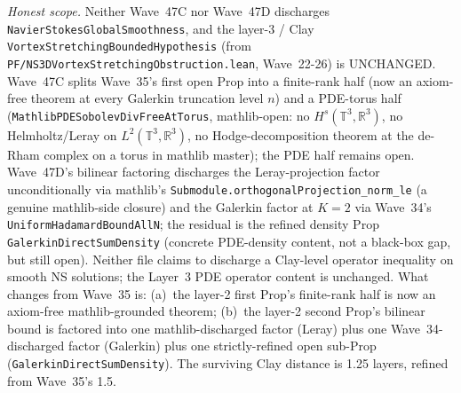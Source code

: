 \begin{remark}
\emph{Honest scope.} Neither Wave~47C nor Wave~47D discharges \texttt{NavierStokesGlobalSmoothness}, and the layer-3 / Clay \texttt{VortexStretchingBoundedHypothesis} (from \texttt{PF/NS3DVortexStretchingObstruction.lean}, Wave~22-26) is UNCHANGED. Wave~47C splits Wave~35's first open Prop into a finite-rank half (now an axiom-free theorem at every Galerkin truncation level $n$) and a PDE-torus half (\texttt{MathlibPDESobolevDivFreeAtTorus}, mathlib-open: no $H^s(\mathbb{T}^3, \mathbb{R}^3)$, no Helmholtz/Leray on $L^2(\mathbb{T}^3, \mathbb{R}^3)$, no Hodge-decomposition theorem at the de-Rham complex on a torus in mathlib master); the PDE half remains open. Wave~47D's bilinear factoring discharges the Leray-projection factor unconditionally via mathlib's \texttt{Submodule.orthogonalProjection\_norm\_le} (a genuine mathlib-side closure) and the Galerkin factor at $K = 2$ via Wave~34's \texttt{UniformHadamardBoundAllN}; the residual is the refined density Prop \texttt{GalerkinDirectSumDensity} (concrete PDE-density content, not a black-box gap, but still open). Neither file claims to discharge a Clay-level operator inequality on smooth NS solutions; the Layer~3 PDE operator content is unchanged. What changes from Wave~35 is: (a)~the layer-2 first Prop's finite-rank half is now an axiom-free mathlib-grounded theorem; (b)~the layer-2 second Prop's bilinear bound is factored into one mathlib-discharged factor (Leray) plus one Wave~34-discharged factor (Galerkin) plus one strictly-refined open sub-Prop (\texttt{GalerkinDirectSumDensity}). The surviving Clay distance is 1.25 layers, refined from Wave~35's 1.5.
\end{remark}

